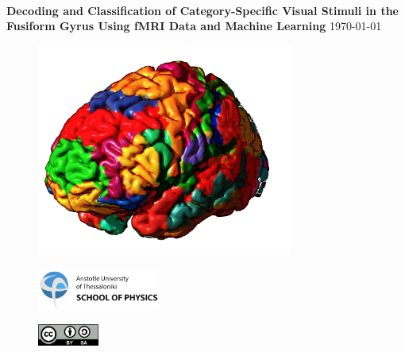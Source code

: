 \begin{titlepage}
\noindent\makebox[\linewidth]{\rule{\textwidth}{0.5pt}}\\[0.2cm]
\LARGE{\textbf{Decoding and Classification of Category-Specific Visual Stimuli in the Fusiform Gyrus Using fMRI Data and Machine Learning}}
\noindent\makebox[\linewidth]{\rule{\textwidth}{0.5pt}}\vspace{0.2cm}
\vspace{2pt}
\large\today

\begin{figure}[H]
    \centering
    \includegraphics[height=7cm]{assets/images/brain_segmentation.png}
    \label{fig:brain_segmentation}
\end{figure}
\vspace{-16pt}

\vspace*{\fill}
\begin{minipage}[t]{0.5\textwidth}
\begin{figure}[H]
    \includegraphics[width=4cm,left]{assets/logo/PhysicsLogo_English.pdf}
\end{figure}
\end{minipage}
\begin{minipage}[t]{0.49\textwidth}
\begin{figure}[H]
    \includegraphics[width=2cm,right]{assets/license/by-sa.png}
\end{figure}
\end{minipage}

\end{titlepage}

